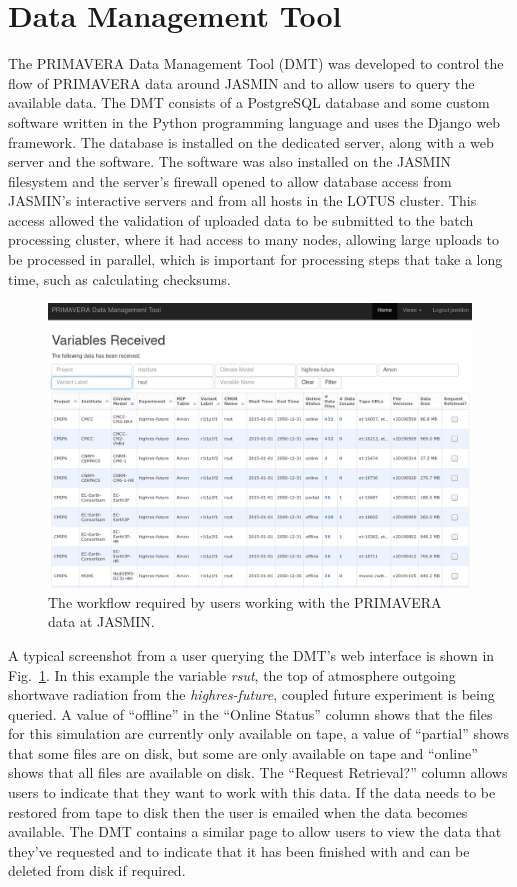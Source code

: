 \documentclass[gmd, manuscript]{copernicus}
\begin{document}
\section{Data Management Tool}

The PRIMAVERA Data Management Tool (DMT) was developed to control the flow of PRIMAVERA data around JASMIN and to allow users to query the available data. The DMT consists of a PostgreSQL database and some custom software written in the Python programming language and uses the Django web framework. The database is installed on the dedicated server, along with a web server and the software. The software was also installed on the JASMIN filesystem and the server's firewall opened to allow database access from JASMIN's interactive servers and from all hosts in the LOTUS cluster. This access allowed the validation of uploaded data to be submitted to the batch processing cluster, where it had access to many nodes, allowing large uploads to be processed in parallel, which is important for processing steps that take a long time, such as calculating checksums.

\begin{figure}[t]
	\includegraphics[width=12cm]{dmt_query.png}
	\caption{The workflow required by users working with the PRIMAVERA data at JASMIN.}
	\label{dmt_query}
\end{figure}

A typical screenshot from a user querying the DMT's web interface is shown in Fig.~\ref{dmt_query}. In this example the variable \textit{rsut}, the top of atmosphere outgoing shortwave radiation from the \textit{highres-future}, coupled future experiment is being queried. A value of ``offline'' in the ``Online Status'' column shows that the files for this simulation are currently only available on tape, a value of ``partial'' shows that some files are on disk, but some are only available on tape and ``online'' shows that all files are available on disk. The ``Request Retrieval?'' column allows users to indicate that they want to work with this data. If the data needs to be restored from tape to disk then the user is emailed when the data becomes available. The DMT contains a similar page to allow users to view the data that they've requested and to indicate that it has been finished with and can be deleted from disk if required.
\end{document}
